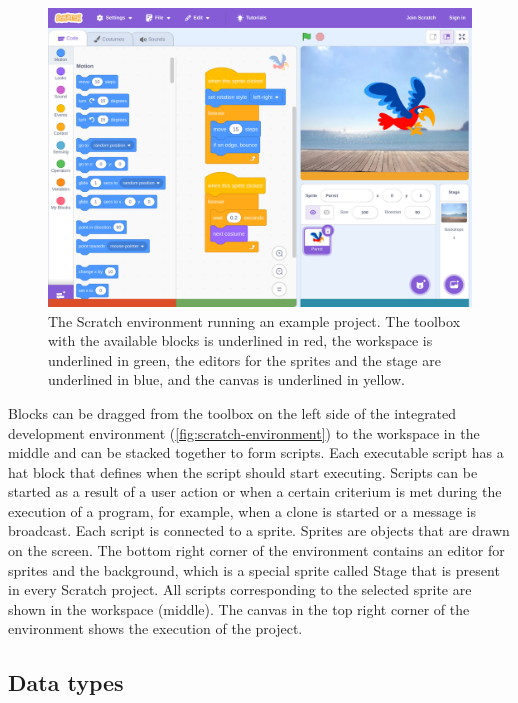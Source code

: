 \documentclass[../main]{subfiles}
\begin{document}
\begin{figure}
    \begin{wide}
        \includegraphics[width=\linewidth]{./scratch-ide}
    \end{wide}
    \caption{The Scratch environment running an example project.
    The toolbox with the available blocks is underlined in red, the workspace is underlined in green, the editors for the sprites and the stage are underlined in blue, and the canvas is underlined in yellow.}
    \label{fig:scratch-environment}
\end{figure}

Blocks can be dragged from the toolbox on the left side of the integrated development environment (\vref{fig:scratch-environment}) to the workspace in the middle and can be stacked together to form scripts.
Each executable script has a hat block that defines when the script should start executing.
Scripts can be started as a result of a user action or when a certain criterium is met during the execution of a program, for example, when a clone is started or a message is broadcast.
Each script is connected to a sprite.
Sprites are objects that are drawn on the screen.
The bottom right corner of the environment contains an editor for sprites and the background, which is a special sprite called Stage that is present in every Scratch project.
All scripts corresponding to the selected sprite are shown in the workspace (middle).
The canvas in the top right corner of the environment shows the execution of the project.

\subsection{Data types}\label{subsec:scratch-data-types}
\end{document}
